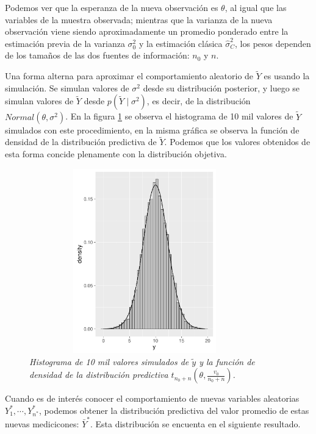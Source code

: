 \documentclass[10pt,openright]{book}\usepackage[]{graphicx}\usepackage[]{color}
\begin{document}
    Podemos ver que la esperanza de la nueva observaci\'on es $\theta$, al igual que las variables de la muestra observada; mientras que la varianza de la nueva observaci\'on viene siendo aproximadamente un promedio ponderado entre la estimaci\'on previa de la varianza $\sigma^2_0$ y la estimaci\'on cl\'asica $\hat{\sigma}^2_C$, los pesos dependen de los tama\~nos de las dos fuentes de informaci\'on: $n_0$ y $n$. 
    
    Una forma alterna para aproximar el comportamiento aleatorio de $\tilde{Y}$ es usando la simulaci\'on. Se simulan valores de $\sigma^2$ desde su distribuci\'on posterior, y luego se simulan valores de $\tilde{Y}$ desde $p(\tilde{Y}\mid\sigma^2)$, es decir, de la distribuci\'on $Normal(\theta,\sigma^2)$. En la figura \ref{Simu_Y_pred1} se observa el histograma de 10 mil valores de $\tilde{Y}$ simulados con este procedimiento, en la misma gr\'afica se observa la funci\'on de densidad de la distribuci\'on predictiva de $\tilde{Y}$. Podemos que los valores obtenidos de esta forma concide plenamente con la distribuci\'on objetiva.
    
    \begin{figure}[!htb]\label{Simu_Y_pred1}
    \centering
    \includegraphics[scale=0.5,width=10cm,height=8cm]{Simu_Y_pred.pdf}
    \caption{\emph{Histograma de 10 mil valores simulados de $\tilde{y}$ y la funci\'on de densidad de la distribuci\'on predictiva $t_{n_0+n}(\theta,\frac{v_0}{n_0+n})$.}}
    \end{figure}
    
    Cuando es de inter\'es conocer el comportamiento de nuevas variables aleatorias $Y_1^*,\cdots,Y_{n^*}^*$, podemos obtener la distribuci\'on predictiva del valor promedio de estas nuevas medicicones: $\bar{Y}^*$. Esta distribuci\'on se encuenta en el siguiente resultado.
    
\end{document}

